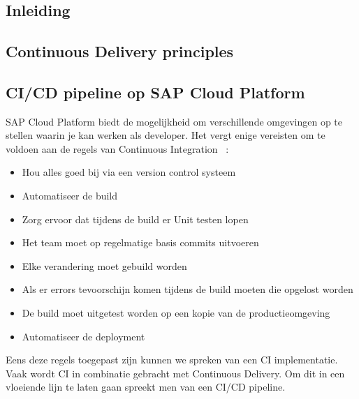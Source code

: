 
\chapter{}
\label{ch:onderzoeksdomein4}

\section{Inleiding}
\label{sec:inleiding}

\section{Continuous Delivery principles}
\label{sec:continuous-delivery-principles}

\section{CI/CD pipeline op SAP Cloud Platform}
\label{sec:ci-cd-op-sap-cloud-platform}
SAP Cloud Platform biedt de mogelijkheid om verschillende omgevingen op te stellen waarin je kan werken als developer. Het vergt enige vereisten om te voldoen aan de regels van Continuous Integration ~\autocite{Kramer2018}:
\begin{itemize}
    \item Hou alles goed bij via een version control systeem
    \item Automatiseer de build
    \item Zorg ervoor dat tijdens de build er Unit testen lopen
    \item Het team moet op regelmatige basis commits uitvoeren
    \item Elke verandering moet gebuild worden
    \item Als er errors tevoorschijn komen tijdens de build moeten die opgelost worden
    \item De build moet uitgetest worden op een kopie van de productieomgeving
    \item Automatiseer de deployment
\end{itemize}
Eens deze regels toegepast zijn kunnen we spreken van een CI implementatie.
Vaak wordt CI in combinatie gebracht met Continuous Delivery. Om dit in een vloeiende lijn te laten gaan spreekt men van een CI/CD pipeline.

